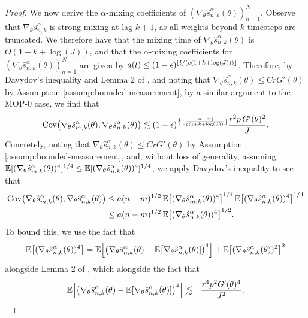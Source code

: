 \begin{proof}
We now derive the $\alpha$-mixing coefficients of $(\nabla_\theta \hat s_{n,k}^\alpha(\theta))_{n=1}^N$. Observe that $\nabla_\theta \hat s_{n,k}^\alpha$ is strong mixing at lag $k+1$, as all weights beyond $k$ timesteps are truncated. We therefore have that the mixing time of $\nabla_\theta \hat s_{n,k}^\alpha(\theta)$ is $O(1+k+\log(J))$, and that the $\alpha$-mixing coefficients for $(\nabla_\theta \hat s_{n,k}^\alpha(\theta))_{n=1}^N$ are given by $a(l) \leq (1-\epsilon)^{\lfloor l/(c(1+k+\log(J))) \rfloor}$.
Therefore, by Davydov's inequality and Lemma 2 of \cite{karjalainen23}, and noting that $\nabla_\theta \hat s_{n,k}^\alpha(\theta) \leq CrG'(\theta)$ by Assumption \ref{assump:bounded-measurement}, by a similar argument to the MOP-0 case, we find that 
\begin{equation}
\mathrm{Cov}\big(\nabla_\theta \hat s_{m,k}^\alpha(\theta), \nabla_\theta \hat s_{n,k}^\alpha(\theta)\big) \lesssim (1-\epsilon)^{\frac{1}{2}\lfloor \frac{|n-m|}{c(1+k+\log(J))} \rfloor}\frac{r^2p \, G'(\theta)^2}{J}.
\end{equation}
Concretely, noting that $\nabla_\theta\hat s_{n,k}^\alpha(\theta)\leq CrG'(\theta)$ by Assumption \ref{assump:bounded-measurement}, and, without loss of generality, assuming $\mathbb{E}[(\nabla_\theta\hat s_{m,k}^\alpha(\theta))^4]^{1/4}\leq\mathbb{E}[(\nabla_\theta\hat s_{n,k}^\alpha(\theta))^4]^{1/4}$, we apply Davydov's inequality to see that
\begin{align}
    \mathrm{Cov}\big(\nabla_\theta\hat s_{m,k}^\alpha(\theta), \nabla_\theta\hat s_{n,k}^\alpha(\theta)\big) 
    &\leq a(n-m)^{1/2} \, \mathbb{E}\big[(\nabla_\theta\hat s_{m,k}^\alpha(\theta))^4\big]^{1/4} \, \mathbb{E}\big[(\nabla_\theta\hat s_{n,k}^\alpha(\theta))^4\big]^{1/4}\\
    &\leq a(n-m)^{1/2} \, \mathbb{E}\big[(\nabla_\theta\hat s_{n,k}^\alpha(\theta))^4\big]^{1/2}.
\end{align}
To bound this, we use the fact that 
\begin{equation}
\mathbb{E}\big[(\nabla_\theta\hat s_{n,k}^\alpha(\theta))^4\big] = \mathbb{E}\Big[\big(\nabla_\theta\hat s_{n,k}^\alpha(\theta)-\mathbb{E}\big[\nabla_\theta\hat s_{n,k}^\alpha(\theta)]\big)^4\Big]+\mathbb{E}\big[(\nabla_\theta\hat s_{n,k}^\alpha(\theta))^2\big]^2
\end{equation}
alongside Lemma 2 of \cite{karjalainen23}, which alongside the fact that
\begin{eqnarray}
\E\Big[\big(\nabla_\theta\hat s_{n,k}^\alpha(\theta)-\E[\nabla_\theta\hat s_{n,k}^\alpha(\theta)]\big)^4\Big] &\lesssim& \frac{r^4p^2G'(\theta)^4}{J^2}, 
\\

\end{eqnarray}
\end{proof}

